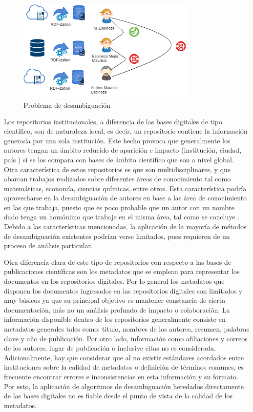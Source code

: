 \documentclass[conference]{IEEEtran}
\begin{document}
\begin{figure}[!t]
\centering
\includegraphics[width=3.5in]{problema}
\caption{Problema de desambiguación}
\label{fig:problema_desambiguacion}
\end{figure}

Los repositorios institucionales, a diferencia de las bases digitales de tipo científico, son de naturaleza local, es decir, un repositorio contiene la información generada por una sola institución. Este hecho provoca que generalmente los autores tengan un ámbito reducido de aparición e impacto (institución, ciudad, país ) si se los compara con bases de ámbito científico que son a nivel global. Otra característica de estos repositorios es que son multidisciplinares, y que abarcan trabajos realizados sobre diferentes áreas de conocimiento tal como matemáticas, economía, ciencias químicas, entre otros. Esta característica podría aprovecharse en la desambiguación de autores en base a las área de conocimiento en las que trabaja, puesto que es poco probable que un autor con un nombre dado tenga un homónimo que trabaje en el misma área, tal como se concluye \cite{journals/sigmod/FerreiraGL12}. Debido a las características mencionadas, la aplicación de la mayoría de métodos de desambiguación existentes podrían verse limitados, pues  requieren de un proceso de análisis particular.

Otra diferencia clara de este tipo de repositorios con respecto a las bases de publicaciones científicas son los metadatos que se emplean para representar los documentos en los repositorios digitales. Por lo general los metadatos que disponen los documentos ingresados en las repositorios digitales son limitados y muy básicos ya que su principal objetivo es mantener constancia de cierta documentación, más no un análisis profundo de impacto o colaboración. La información disponible dentro de los repositorios generalmente consiste en metadatos generales tales como: título, nombres de los autores, resumen, palabras clave y año de publicación. Por otro lado, información como afiliaciones y correos de los autores, lugar de publicación o inclusive citas no es considerada. Adicionalmente, hay que considerar que al no existir estándares acordados entre instituciones sobre la calidad de metadatos o definición de términos comunes, es frecuente encontrar errores e inconsistencias en esta información y su formato. Por esto, la aplicación de algoritmos de desambiguación heredados directamente de las bases digitales no es fiable desde el punto de vista de la calidad de los metadatos.
\end{document}
